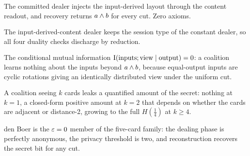 \begin{theorem}
  \label{thm:den_boer_run_output}
  \rocqok
  The committed dealer injects the input-derived layout through the content
  readout, and recovery returns $a\wedge b$ for every cut. Zero axioms.
\end{theorem}

\begin{lemma}
  \label{lem:den_boer_duality}
  \rocqok
  The input-derived-content dealer keeps the session type of the constant
  dealer, so all four duality checks discharge by reduction.
\end{lemma}

\begin{theorem}
  \label{thm:den_boer_input_private}
  \rocqok
  The conditional mutual information $\mathrm{I}(\text{inputs};\text{view}\mid
  \text{output}) = 0$: a coalition learns nothing about the inputs beyond
  $a\wedge b$, because equal-output inputs are cyclic rotations giving an
  identically distributed view under the uniform cut.
\end{theorem}

\begin{theorem}
  \label{thm:leak_ramp}
  \rocqok
  A coalition seeing $k$ cards leaks a quantified amount of the secret: nothing
  at $k=1$, a closed-form positive amount at $k=2$ that depends on whether the
  cards are adjacent or distance-2, growing to the full $H(\tfrac14)$ at $k\ge4$.
\end{theorem}

\begin{theorem}
  \label{thm:den_boer_profile}
  \rocqok
  den Boer is the $\varepsilon=0$ member of the five-card family: the dealing phase is
  perfectly anonymous, the privacy threshold is two, and reconstruction recovers
  the secret bit for any cut.
\end{theorem}

